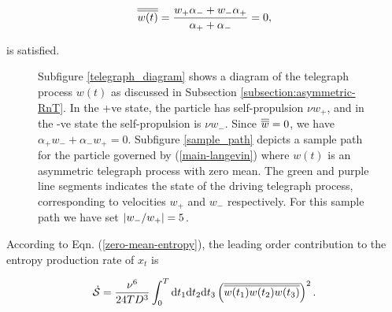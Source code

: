 \begin{align}\label{zero-mean}
    \overline{\overline{w(t)}} = \frac{w_+\alpha_- + w_-\alpha_+}{\alpha_+ + \alpha_-} = 0,
\end{align}

is satisfied. 

\begin{figure}
\centering
{}
\hfill
{}
\caption{\footnotesize Subfigure \ref{telegraph_diagram} shows a diagram of the telegraph process $w(t)$ as discussed in Subsection \ref{subsection:asymmetric-RnT}. In the +ve state, the particle has self-propulsion $\nu w_+$, and in the -ve state the self-propulsion is $\nu w_-$. Since $\overline{\overline{w}} = 0$, we have $\alpha_+w_- + \alpha_-w_+ = 0$. Subfigure \ref{sample_path} depicts a sample path for the particle governed by (\ref{main-langevin}) where $w(t)$ is an asymmetric telegraph process with zero mean. The green and purple line segments indicates the state of the driving telegraph process, corresponding to velocities $w_+$ and $w_-$ respectively. For this sample path we have set $\abs{w_-/w_+}= 5$.}
\label{figure1}
\end{figure}

According to Eqn. (\ref{zero-mean-entropy}), the leading order contribution to the entropy production rate of $x_t$ is 

\begin{align}\label{RnT-entroppy-int}
\dot{\mathcal{S}} = \frac{\nu^6}{24TD^3}\int_0^T \mathrm{d} t_1 \mathrm{d} t_2 \mathrm{d} t_3 \left(\overline{\overline{w(t_1)w(t_2)w(t_3)}}\right)^2. 
\end{align}


